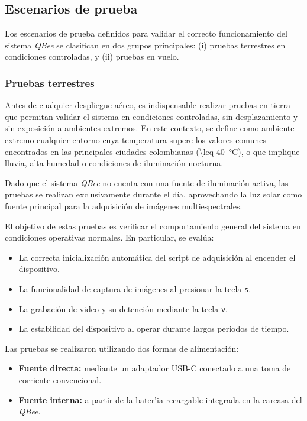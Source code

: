     
    
    

  \subsection{Escenarios de prueba}
    Los escenarios de prueba definidos para validar el correcto funcionamiento del sistema \textit{QBee} se clasifican en dos grupos principales: (i) pruebas terrestres en condiciones controladas, y (ii) pruebas en vuelo.

    \subsubsection{Pruebas terrestres}
    
        Antes de cualquier despliegue aéreo, es indispensable realizar pruebas en tierra que permitan validar el sistema en condiciones controladas, sin desplazamiento y sin exposición a ambientes extremos. En este contexto, se define como ambiente extremo cualquier entorno cuya temperatura supere los valores comunes encontrados en las principales ciudades colombianas (\SI{\leq 40}{\celsius}), o que implique lluvia, alta humedad o condiciones de iluminación nocturna.
        
        \noindent Dado que el sistema \textit{QBee} no cuenta con una fuente de iluminación activa, las pruebas se realizan exclusivamente durante el día, aprovechando la luz solar como fuente principal para la adquisición de imágenes multiespectrales.
        
        \noindent El objetivo de estas pruebas es verificar el comportamiento general del sistema en condiciones operativas normales. En particular, se evalúa:
        
        \begin{itemize}
        \item La correcta inicialización automática del script de adquisición al encender el dispositivo.
        \item La funcionalidad de captura de imágenes al presionar la tecla \texttt{s}.
        \item La grabación de video y su detención mediante la tecla \texttt{v}.
        \item La estabilidad del dispositivo al operar durante largos periodos de tiempo.
        \end{itemize}
        
        \noindent Las pruebas se realizaron utilizando dos formas de alimentación:
        \begin{itemize}
        \item \textbf{Fuente directa:} mediante un adaptador USB-C conectado a una toma de corriente convencional.
        \item \textbf{Fuente interna:} a partir de la bater'ia recargable integrada en la carcasa del \textit{QBee}.
        \end{itemize}
        
